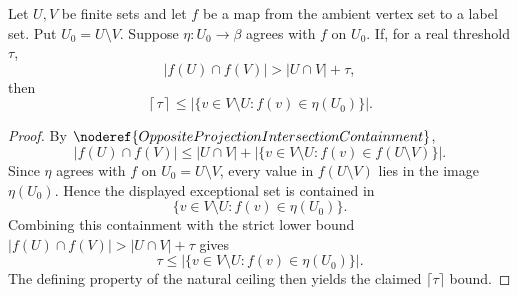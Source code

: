\begin{lemma}
Let \(U,V\) be finite sets and let \(f\) be a map from the ambient vertex set to a label set.  Put \(U_0=U\setminus V\).  Suppose \(\eta:U_0\to \beta\) agrees with \(f\) on \(U_0\).  If, for a real threshold \(\tau\),
\[
  |f(U)\cap f(V)|>|U\cap V|+\tau,
\]
then
\[
  \left\lceil \tau\right\rceil
  \le
  \left|\{v\in V\setminus U: f(v)\in \eta(U_0)\}\right|.
\]
\end{lemma}
\begin{proof}
By \(\noderef{OppositeProjectionIntersectionContainment}\),
\[
  |f(U)\cap f(V)|
  \le
  |U\cap V|+
  \left|\{v\in V\setminus U:f(v)\in f(U\setminus V)\}\right|.
\]
Since \(\eta\) agrees with \(f\) on \(U_0=U\setminus V\), every value in \(f(U\setminus V)\) lies in the image \(\eta(U_0)\).  Hence the displayed exceptional set is contained in
\[
  \{v\in V\setminus U:f(v)\in \eta(U_0)\}.
\]
Combining this containment with the strict lower bound
\(|f(U)\cap f(V)|>|U\cap V|+\tau\) gives
\[
  \tau
  \le
  \left|\{v\in V\setminus U:f(v)\in \eta(U_0)\}\right|.
\]
The defining property of the natural ceiling then yields the claimed
\(\lceil\tau\rceil\) bound.
\end{proof}
